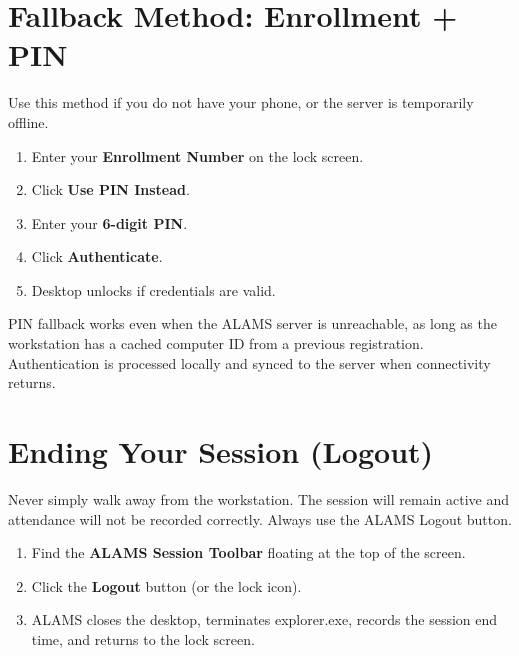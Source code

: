 \section{Fallback Method: Enrollment + PIN}

Use this method if you do not have your phone, or the server is temporarily offline.

\begin{enumerate}[leftmargin=*, label=\textbf{Step \arabic*.}]
  \item Enter your \textbf{Enrollment Number} on the lock screen.
  \item Click \textbf{Use PIN Instead}.
  \item Enter your \textbf{6-digit PIN}.
  \item Click \textbf{Authenticate}.
  \item Desktop unlocks if credentials are valid.
\end{enumerate}

\begin{tcolorbox}[alamsbox, title={\faInfoCircle\quad Offline Mode}]
PIN fallback works even when the ALAMS server is unreachable, as long as the workstation has a cached computer ID from a previous registration. Authentication is processed locally and synced to the server when connectivity returns.
\end{tcolorbox}

\section{Ending Your Session (Logout)}

\begin{tcolorbox}[dangerbox, title={\faExclamationCircle\quad Always Log Out Properly}]
Never simply walk away from the workstation. The session will remain active and attendance will not be recorded correctly. Always use the ALAMS Logout button.
\end{tcolorbox}

\begin{enumerate}[leftmargin=*, label=\textbf{Step \arabic*.}]
  \item Find the \textbf{ALAMS Session Toolbar} floating at the top of the screen.
  \item Click the \textbf{Logout} button (or the lock icon).
  \item ALAMS closes the desktop, terminates explorer.exe, records the session end time, and returns to the lock screen.
\end{enumerate}


